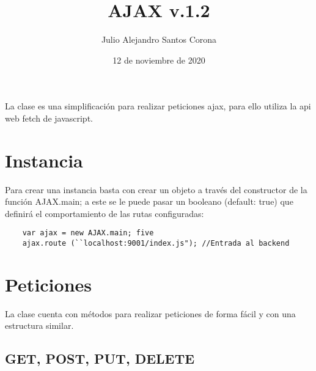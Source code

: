 \documentclass[10pt]{article}
\title{AJAX v.1.2}
\author{Julio Alejandro Santos Corona}
\date{12 de noviembre de 2020}
\begin{document}

\lstset{breaklines=true, tabsize=4, language=JavaScript}

\maketitle

La clase es una simplificación para realizar peticiones ajax, para ello utiliza la api web fetch de javascript.

\section{Instancia}

Para crear una instancia basta con crear un objeto a través del constructor de la función AJAX.main; a este se le puede pasar un booleano (default: true) que definirá el comportamiento de las rutas configuradas:
\\
\begin{lstlisting}
	var ajax = new AJAX.main; five
	ajax.route (``localhost:9001/index.js"); //Entrada al backend
\end{lstlisting}

\section{Peticiones}
La clase cuenta con métodos para realizar peticiones de forma fácil y con una estructura similar.

\subsection{GET, POST, PUT, DELETE}
\end{document}
